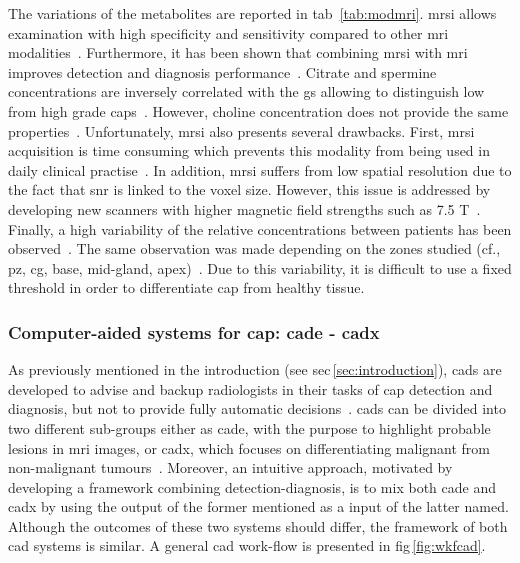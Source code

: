 The variations of the metabolites are reported in \ac{tab}~\ref{tab:modmri}. \ac{mrsi} allows examination with high specificity and sensitivity compared to other \ac{mri} modalities~\cite{Choi2007}. Furthermore, it has been shown that combining \ac{mrsi} with \ac{mri} improves detection and diagnosis performance~\cite{Scheidler1999a,Kaji1998,Vilanova2009}. Citrate and spermine concentrations are inversely correlated with the \ac{gs} allowing to distinguish low from high grade \acp{cap}~\cite{Giskeodegard2013}. However, choline concentration does not provide the same properties~\cite{Giskeodegard2013}. Unfortunately, \ac{mrsi} also presents several drawbacks. First, \ac{mrsi} acquisition is time consuming which prevents this modality from being used in daily clinical practise~\cite{Barentsz2012}. In addition, \ac{mrsi} suffers from low spatial resolution due to the fact that \ac{snr} is linked to the voxel size. However, this issue is addressed by developing new scanners with higher magnetic field strengths such as 7.5 T~\cite{Giskeodegard2013}. Finally, a high variability of the relative concentrations between patients has been observed~\cite{Choi2007}. The same observation was made depending on the zones studied (cf., \ac{pz}, \ac{cg}, base, mid-gland, apex)~\cite{Walker2010,Lemaitre2011}. Due to this variability, it is difficult to use a fixed threshold in order to differentiate \ac{cap} from healthy tissue.

\subsubsection{Computer-aided systems for \ac{cap}: \ac{cade} - \ac{cadx}} \label{subsubsec:CAD}

As previously mentioned in the introduction (see \acs{sec}\,\ref{sec:introduction}), \acp{cad} are developed to advise and backup radiologists in their tasks of \ac{cap} detection and diagnosis, but not to provide fully automatic decisions~\cite{Giger2008}. \acp{cad} can be divided into two different sub-groups either as \ac{cade}, with the purpose to highlight probable lesions in \ac{mri} images, or \ac{cadx}, which focuses on differentiating malignant from non-malignant tumours~\cite{Giger2008}. Moreover, an intuitive approach, motivated by developing a framework combining detection-diagnosis, is to mix both \ac{cade} and \ac{cadx} by using the output of the former mentioned as a input of the latter named. Although the outcomes of these two systems should differ, the framework of both \ac{cad} systems is similar. A general \ac{cad} work-flow is presented in \acs{fig}\,\ref{fig:wkfcad}.

